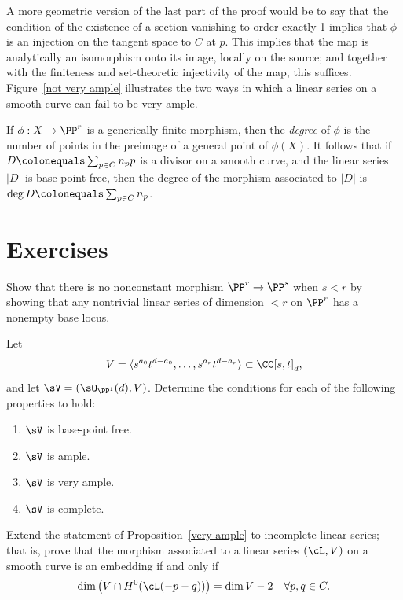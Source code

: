 A more geometric version of the last part of the proof would be to say that the condition of the existence of a section
vanishing to order exactly 1 implies that $\phi$ is an injection on the tangent space to $C$ at $p$. This implies that
the map is analytically an isomorphism onto its image, locally on the source;
 and together with the finiteness and set-theoretic injectivity of the map, this suffices. Figure~\ref{not very ample} illustrates
 the two ways in which a linear series on a smooth curve can fail to be very ample.

If $\phi:X \to \PP^r$ is a generically finite morphism, then the
\emph{degree} of $\phi$ is the number of points in the preimage of a
general point of $\phi(X)$. It follows that if $D \colonequals \sum_{p\in C}
n_pp$ is a divisor on a smooth curve, and the linear series $|D|$ is
base-point free, then the degree of the morphism associated to $|D|$
is $\deg D \colonequals \sum_{p\in C} n_p$.
{\meshing\par}

\section*{Exercises}

\begin{exercise}\label{here there be basepoints}
 Show that there is no nonconstant morphism $\PP^r\to \PP^s$ when $s<r$ by showing that any nontrivial linear
 series of dimension $<r$ on $\PP^r$ has a nonempty base locus. 
\end{exercise}

\begin{exercise}
Let
$$
V = \langle s^{a_0}t^{d-a_0}, \dots, s^{a_r}t^{d-a_r}\rangle \subset \CC[s,t]_d,
$$
and let $\sV = (\sO_{\PP^1}(d), V)$. Determine the conditions for
each of the following properties to hold:
\begin{enumerate}
 \item $\sV$ is base-point free.
 \item $\sV$ is ample.
 \item $\sV$ is very ample.
 \item $\sV$ is complete.
\end{enumerate}
\end{exercise}

\begin{exercise}
Extend the statement of Proposition~\ref{very ample} to incomplete linear series; that is, prove that the morphism associated to a linear series $(\cL, V)$
on a smooth curve is an embedding if and only if
$$
\dim\big( V \cap H^0(\cL(-p-q))\big) = \dim V - 2 \quad \forall p, q \in C.
$$
\end{exercise}

